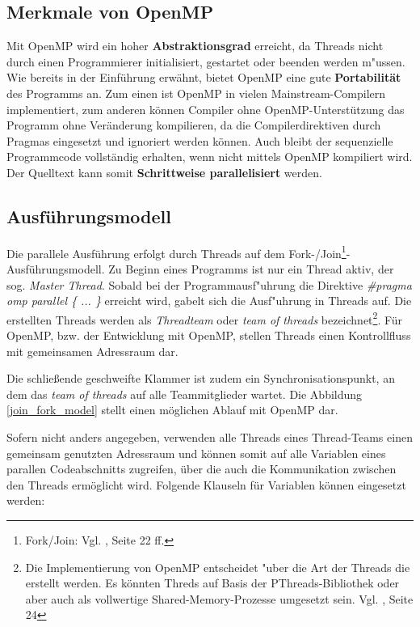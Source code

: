 \documentclass[11pt]{scrartcl}
\begin{document}
\subsection{Merkmale von OpenMP}

Mit OpenMP wird ein hoher \textbf{Abstraktionsgrad} erreicht, da Threads nicht durch einen Programmierer initialisiert, gestartet oder beenden werden m"ussen. Wie bereits in der Einführung erwähnt, bietet OpenMP eine gute \textbf{Portabilität} des Programms an. Zum einen ist OpenMP in vielen Mainstream-Compilern implementiert, zum anderen können Compiler ohne OpenMP-Unterstützung das Programm ohne Veränderung kompilieren, da die Compilerdirektiven durch Pragmas eingesetzt und ignoriert werden können. Auch bleibt der sequenzielle Programmcode vollständig erhalten, wenn nicht mittels OpenMP kompiliert wird. Der Quelltext kann somit \textbf{Schrittweise parallelisiert} werden. 

\subsection{Ausführungsmodell}

Die parallele Ausführung erfolgt durch Threads auf dem Fork-/Join\footnote{Fork/Join: Vgl. \cite{openmp08}, Seite 22 ff.}-Ausführungsmodell. Zu Beginn eines Programms ist nur ein Thread aktiv, der sog. \textit{Master Thread}. Sobald bei der Programmausf"uhrung die Direktive \textit{\#pragma omp parallel \{ ... \} } erreicht wird, gabelt sich die Ausf"uhrung in Threads auf. Die erstellten Threads werden als \textit{Threadteam} oder \textit{team of threads} bezeichnet\footnote{Die Implementierung von OpenMP entscheidet "uber die Art der Threads die erstellt werden. Es könnten Threds auf Basis der PThreads-Bibliothek oder aber auch als vollwertige Shared-Memory-Prozesse umgesetzt sein. Vgl. \cite{openmp08}, Seite 24}. Für OpenMP, bzw. der Entwicklung mit OpenMP, stellen Threads einen Kontrollfluss mit gemeinsamen Adressraum dar. 

Die schließende geschweifte Klammer ist zudem ein Synchronisationspunkt, an dem das \emph{team of threads} auf alle Teammitglieder wartet. Die Abbildung \ref{join_fork_model} stellt einen möglichen Ablauf mit OpenMP dar.

Sofern nicht anders angegeben, verwenden alle Threads eines Thread-Teams einen gemeinsam genutzten Adressraum und können somit auf alle Variablen eines parallen Codeabschnitts zugreifen, über die auch die Kommunikation zwischen den Threads ermöglicht wird. Folgende Klauseln für Variablen können eingesetzt werden:
\end{document}
